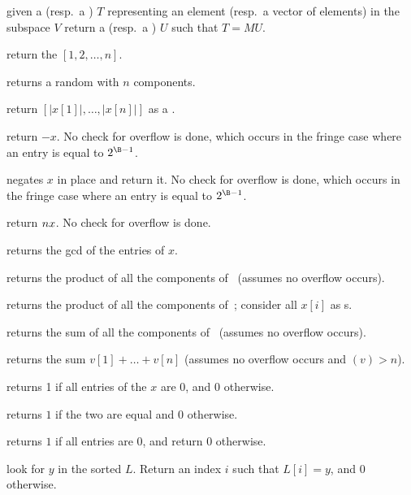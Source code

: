  given a  (resp.~a )
$T$ representing an element (resp.~a vector of elements) in the subspace $V$
return a  (resp.~a ) $U$ such that $T = MU$.


 return the  $[1, 2, \dots, n]$.

 returns a random  with $n$ components.

 return $[|x[1]|,\ldots,|x[n]|]$ as a .

 return $-x$. No check for overflow is done, which
occurs in the fringe case where an entry is equal to $2^{\B-1}$.

 negates $x$ in place and return it. No check
for overflow is done, which occurs in the fringe case where an entry is equal
to $2^{\B-1}$.



 return $n\*x$. No check for overflow is
done.

 returns the gcd of the entries of $x$.


 returns the product of all the components
of~ (assumes no overflow occurs).

 returns the product of all the components
of~; consider all $x[i]$ as s.

 returns the sum of all the components
of~ (assumes no overflow occurs).

 returns the sum $v[1] + \dots + v[n]$
(assumes no overflow occurs and $(v) > n$).

 returns 1 if all entries of the  $x$ are $0$,
and $0$ otherwise.

 returns $1$ if the two  are equal
and $0$ otherwise.

 returns $1$ if all entries are $0$, and return
$0$ otherwise.

 look for $y$ in the sorted
 $L$. Return an index $i$ such that $L[i] = y$, and  $0$ otherwise.


